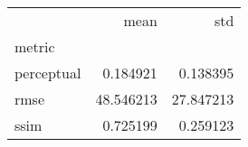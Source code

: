 \begin{tabular}{lrr}
\toprule
{} &       mean &        std \\
metric     &            &            \\
\midrule
perceptual &   0.184921 &   0.138395 \\
rmse       &  48.546213 &  27.847213 \\
ssim       &   0.725199 &   0.259123 \\
\bottomrule
\end{tabular}
